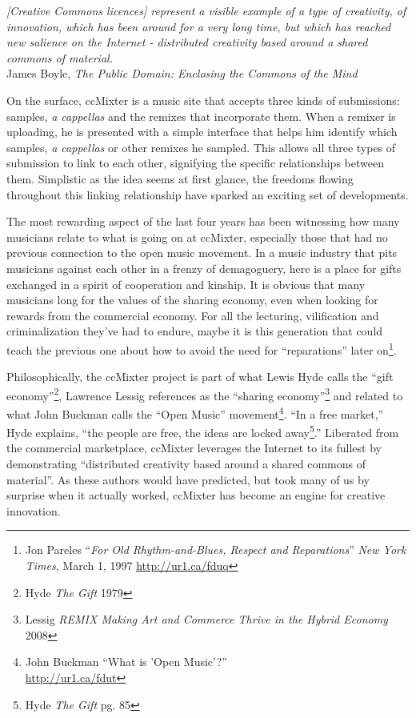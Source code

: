 \begin{flushright}
\textit{[Creative Commons licences] represent a visible example of a type of
creativity, of innovation, which has been around for a very long time, but which
has reached new salience on the Internet - distributed creativity based around a
shared commons of material.}\\
James Boyle, \textit{The Public Domain: Enclosing the Commons of the Mind}
\end{flushright}

On the surface, ccMixter is a music site that accepts three kinds of
submissions: samples, \textit{a cappellas} and the remixes that incorporate
them. When a remixer is uploading, he is presented with a simple interface that
helps him identify which samples, \textit{a cappellas} or other remixes he
sampled. This allows all three types of submission to link to each other,
signifying the specif\hbox{}ic relationships between them. Simplistic as the idea seems
at f\hbox{}irst glance, the freedoms f\hbox{}lowing throughout this linking relationship have
sparked an exciting set of developments.

The most rewarding aspect of the last four years has been witnessing how many
musicians relate to what is going on at ccMixter, especially those that had no
previous connection to the open music movement. In a music industry that pits
musicians against each other in a frenzy of demagoguery, here is a place for
gifts exchanged in a spirit of cooperation and kinship. It is obvious that many
musicians long for the values of the sharing economy, even when looking for
rewards from the commercial economy. For all the lecturing, vilif\hbox{}ication and
criminalization they've had to endure, maybe it is this generation that could
teach the previous one about how to avoid the need for ``reparations'' later
on\footnote{Jon Pareles ``\textit{For Old Rhythm-and-Blues, Respect and
Reparations}'' \textit{New York Times}, March 1, 1997 
\url{http://ur1.ca/fduq}}.

Philosophically, the ccMixter project is part of what Lewis Hyde calls the
``gift economy''\footnote{Hyde \textit{The Gift} 1979}, Lawrence Lessig
references as  the ``sharing economy''\footnote{Lessig \textit{REMIX Making Art
and Commerce Thrive in the Hybrid Economy} 2008} and related to what John
Buckman calls the ``Open Music'' movement\footnote{John Buckman ``What is 'Open
Music'?''\\
\url{http://ur1.ca/fdut}}. ``In a free market,'' Hyde explains,
``the people are free, the ideas are locked away\footnote{Hyde \textit{The Gift}
pg. 85}.'' Liberated from the commercial marketplace, ccMixter leverages the
Internet to its fullest by demonstrating ``distributed creativity based around a
shared commons of material''. As these authors would have predicted, but took
many of us by surprise when it actually worked, ccMixter has become an engine
for creative innovation. 


